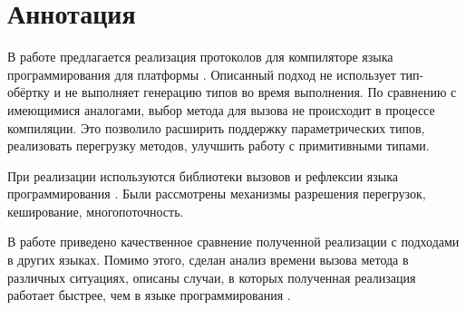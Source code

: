 \section*{Аннотация}

В работе предлагается реализация протоколов для компиляторе языка программирования  для платформы . Описанный подход не использует тип-обёртку и не выполняет генерацию типов во время выполнения. По сравнению с имеющимися аналогами, выбор метода для вызова не происходит в процессе компиляции. Это позволило расширить поддержку параметрических типов, реализовать перегрузку методов, улучшить работу с примитивными типами.

При реализации используются библиотеки вызовов и рефлексии языка программирования . Были рассмотрены механизмы разрешения перегрузок, кеширование, многопоточность.

В работе приведено качественное сравнение полученной реализации с подходами в других языках. Помимо этого, сделан анализ времени вызова метода в различных ситуациях, описаны случаи, в которых полученная реализация работает быстрее, чем в языке программирования .
